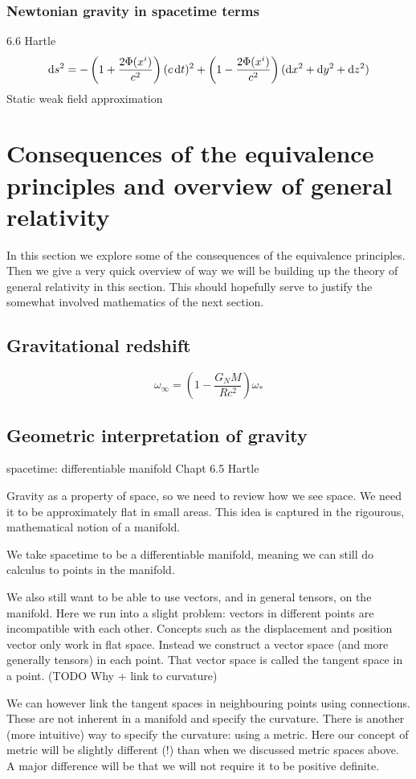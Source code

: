 \subsection{Newtonian gravity in spacetime terms}
6.6 Hartle
\[ \operatorname{d \!}{s}^2 = - \left(1+ \frac{2\Phi(x^i)}{c^2}\right)(c \operatorname{d \!}{t})^2 + \left(1- \frac{2\Phi(x^i)}{c^2}\right)(\operatorname{d \!}{x}^2 + \operatorname{d \!}{y}^2 + \operatorname{d \!}{z}^2) \]
Static weak field approximation


\chapter{Consequences of the equivalence principles and overview of general relativity}
In this section we explore some of the consequences of the equivalence principles. Then we give a very quick overview of way we will be building up the theory of general relativity in this section. This should hopefully serve to justify the somewhat involved mathematics of the next section.

\section{Gravitational redshift}
\[ \omega_\infty = \left(1- \frac{G_N M}{Rc^2}\right)\omega_* \]

\section{Geometric interpretation of gravity}
spacetime: differentiable manifold
Chapt 6.5 Hartle

Gravity as a property of space, so we need to review how we see space. We need it to be approximately flat in small areas. This idea is captured in the rigourous, mathematical notion of a manifold.

We take spacetime to be a differentiable manifold, meaning we can still do calculus to points in the manifold.

We also still want to be able to use vectors, and in general tensors, on the manifold. Here we run into a slight problem: vectors in different points are incompatible with each other. Concepts such as the displacement and position vector only work in flat space. Instead we construct a vector space (and more generally tensors) in each point. That vector space is called the tangent space in a point. (TODO Why + link to curvature)

We can however link the tangent spaces in neighbouring points using connections. These are not inherent in a manifold and specify the curvature. There is another (more intuitive) way to specify the curvature: using a metric. Here our concept of metric will be slightly different (!) than when we discussed metric spaces above. A major difference will be that we will not require it to be positive definite.

